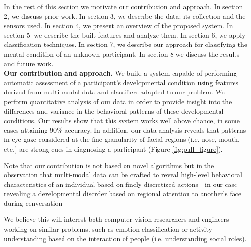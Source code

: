 \documentclass[10pt,twocolumn,letterpaper]{article}
\begin{document}

In the rest of this section we motivate our contribution and approach. In section 2, we discuss prior work. In section 3, we describe the data: its collection and the sensors used. In section 4, we present an overview of the proposed system. In section 5, we describe the built features and analyze them. In section 6, we apply classification techniques. In section 7, we describe our approach for classifying the mental condition of an unknown participant. In section 8 we discuss the results and future work.\\


\noindent \textbf{Our contribution and approach.} We build a system capable of performing automatic assessment of a participant's developmental condition using features derived from multi-modal data and classifiers adapted to our problem. We perform quantitative analysis of our data in order to provide insight into the differences and variance in the behavioral patterns of these developmental conditions. Our results show that this system works well above chance, in some cases attaining 90\% accuracy. In addition, our data analysis reveals that patterns in eye gaze considered at the fine granularity of facial regions (i.e. nose, mouth, etc.) are strong cues in diagnosing a participant (Figure \ref{fig:pull_figure}). 

Note that our contribution is not based on novel algorithms but in the observation that multi-modal data can be crafted to reveal high-level behavioral characteristics of an individual based on finely discretized actions - in our case revealing a developmental disorder based on regional attention to another's face during conversation. 

We believe this will interest both computer vision researchers and engineers working on similar problems, such as emotion classification or activity understanding based on the interaction of people (i.e. understanding social roles).
\end{document}
